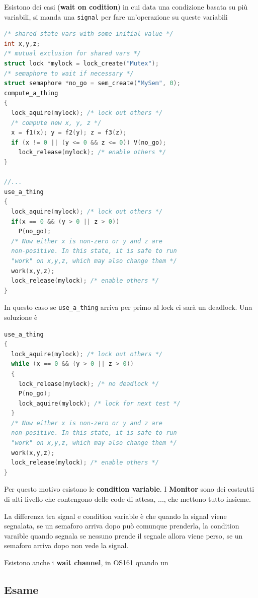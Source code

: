 \documentclass[12pt]{article}
\begin{document}
Esistono dei casi (\textbf{wait on codition}) in cui data una condizione basata su pi\`u variabili, si manda una \texttt{signal} per fare un'operazione su queste variabili
\begin{lstlisting}[language=c]
/* shared state vars with some initial value */
int x,y,z;
/* mutual exclusion for shared vars */
struct lock *mylock = lock_create("Mutex");
/* semaphore to wait if necessary */
struct semaphore *no_go = sem_create("MySem", 0);
compute_a_thing
{
  lock_aquire(mylock); /* lock out others */
  /* compute new x, y, z */
  x = f1(x); y = f2(y); z = f3(z);
  if (x != 0 || (y <= 0 && z <= 0)) V(no_go);
    lock_release(mylock); /* enable others */
}

//...
use_a_thing
{
  lock_aquire(mylock); /* lock out others */
  if(x == 0 && (y > 0 || z > 0))
    P(no_go);
  /* Now either x is non-zero or y and z are
  non-positive. In this state, it is safe to run
  "work" on x,y,z, which may also change them */
  work(x,y,z);
  lock_release(mylock); /* enable others */
}
\end{lstlisting}
In questo caso se \texttt{use\_a\_thing} arriva per primo al lock ci sar\`a un deadlock. Una soluzione \`e
\begin{lstlisting}[language=c]
use_a_thing 
{
  lock_aquire(mylock); /* lock out others */
  while (x == 0 && (y > 0 || z > 0)) 
  {
    lock_release(mylock); /* no deadlock */
    P(no_go);
    lock_aquire(mylock); /* lock for next test */
  }
  /* Now either x is non-zero or y and z are
  non-positive. In this state, it is safe to run
  "work" on x,y,z, which may also change them */
  work(x,y,z);
  lock_release(mylock); /* enable others */
}
\end{lstlisting}
Per questo motivo esistono le \textbf{condition variable}. I \textbf{Monitor} sono dei costrutti di alti livello che contengono delle code di attesa, ..., che mettono tutto insieme.

La differenza tra signal e condition variable \`e che quando la signal viene segnalata, se un semaforo arriva dopo pu\`o comunque prenderla, la condition varaible quando segnala se nessuno prende il segnale allora viene perso, se un semaforo arriva dopo non vede la signal.

Esistono anche i \textbf{wait channel}, in OS161 quando un 






\subsection{Esame}
\end{document}
